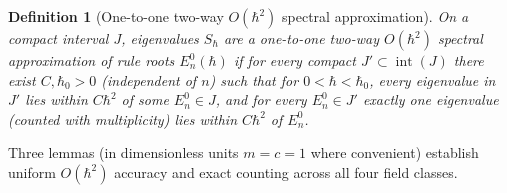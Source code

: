\documentclass[aps,prd,onecolumn,tightenlines,nofootinbib,notitlepage,10pt,floatfix]{revtex4-2}
\theoremstyle{indentedtheorem}
\newtheorem{definition}{Definition}
\begin{document}
\begin{definition}[One-to-one two-way $O(\hbar^2)$ spectral approximation]\label{def:two_way}
On a compact interval $J$, eigenvalues $S_\hbar$ are a \emph{one-to-one two-way $O(\hbar^2)$ spectral approximation} of rule roots $E_n^0(\hbar)$ if for every compact $J'\subset\operatorname{int}(J)$ there exist $C,\hbar_0>0$ (independent of $n$) such that for $0<\hbar<\hbar_0$, every eigenvalue in $J'$ lies within $C\hbar^2$ of some $E_n^0\in J$, and for every $E_n^0\in J'$ \emph{exactly one} eigenvalue (counted with multiplicity) lies within $C\hbar^2$ of $E_n^0$.
\end{definition}

Three lemmas (in dimensionless units $m=c=1$ where convenient) establish uniform $O(\hbar^2)$ accuracy and exact counting across all four field classes.
\end{document}
